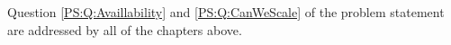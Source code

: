 Question \ref{PS:Q:Availlability} and \ref{PS:Q:CanWeScale} of the problem statement are addressed by all of the chapters above.

%
%
%
%
%
%




